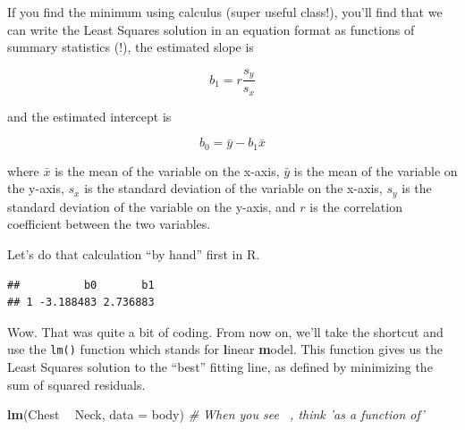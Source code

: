 \documentclass[]{book}
\newenvironment{Shaded}{\begin{snugshade}}{\end{snugshade}}
\newcommand{\CommentTok}[1]{\textcolor[rgb]{0.56,0.35,0.01}{\textit{#1}}}
\newcommand{\DataTypeTok}[1]{\textcolor[rgb]{0.13,0.29,0.53}{#1}}
\newcommand{\KeywordTok}[1]{\textcolor[rgb]{0.13,0.29,0.53}{\textbf{#1}}}
\newcommand{\NormalTok}[1]{#1}
\newcommand{\OperatorTok}[1]{\textcolor[rgb]{0.81,0.36,0.00}{\textbf{#1}}}
\newcommand{\StringTok}[1]{\textcolor[rgb]{0.31,0.60,0.02}{#1}}
\begin{document}
If you find the minimum using calculus (super useful class!), you'll find that we can write the Least Squares solution in an equation format as functions of summary statistics (!), the estimated slope is

\[ b_1  = r\frac{s_y}{s_x}\]

and the estimated intercept is

\[ b_0 = \bar{y} - b_1\bar{x} \]

where \(\bar{x}\) is the mean of the variable on the x-axis, \(\bar{y}\) is the mean of the variable on the y-axis, \(s_x\) is the standard deviation of the variable on the x-axis, \(s_y\) is the standard deviation of the variable on the y-axis, and \(r\) is the correlation coefficient between the two variables.

Let's do that calculation ``by hand'' first in R.

\begin{Shaded}
\end{Shaded}

\begin{verbatim}
##          b0       b1
## 1 -3.188483 2.736883
\end{verbatim}

Wow. That was quite a bit of coding. From now on, we'll take the shortcut and use the \texttt{lm()} function which stands for \textbf{l}inear \textbf{m}odel. This function gives us the Least Squares solution to the ``best'' fitting line, as defined by minimizing the sum of squared residuals.

\begin{Shaded}
\begin{Highlighting}[]
\KeywordTok{lm}\NormalTok{(Chest }\OperatorTok{~}\StringTok{ }\NormalTok{Neck, }\DataTypeTok{data =}\NormalTok{ body) }\CommentTok{# When you see ~, think 'as a function of'}
\end{Highlighting}
\end{Shaded}
\end{document}
